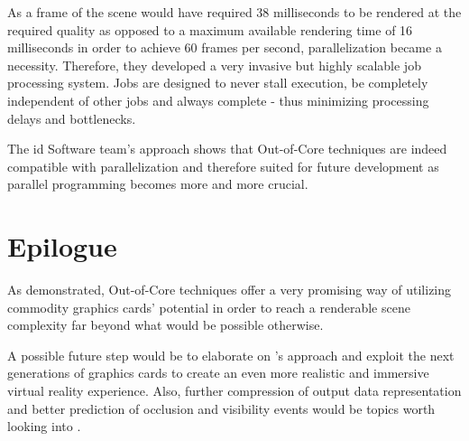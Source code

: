 As a frame of the scene would have required 38 milliseconds to be rendered at the required quality as opposed to a maximum available rendering time of 16 milliseconds in order to achieve 60 frames per second, parallelization became a necessity. Therefore, they developed a very invasive but highly scalable job processing system. Jobs are designed to never stall execution, be completely independent of other jobs and always complete - thus minimizing processing delays and bottlenecks.

The id Software team's approach shows that Out-of-Core techniques are indeed compatible with parallelization and therefore suited for future development as parallel programming becomes more and more crucial.

\chapter{Epilogue}
\label{ch:Epilogue}

As demonstrated, Out-of-Core techniques offer a very promising way of utilizing commodity graphics cards' potential in order to reach a renderable scene complexity far beyond what would be possible otherwise. 

A possible future step would be to elaborate on \cite{10.1007/978-3-540-40014-1_3}'s approach and exploit the next generations of graphics cards to create an even more realistic and immersive virtual reality experience. Also, further compression of output data representation and better prediction of occlusion and visibility events would be topics worth looking into \cite{Gobbetti:2005:FVM:1073204.1073277}.